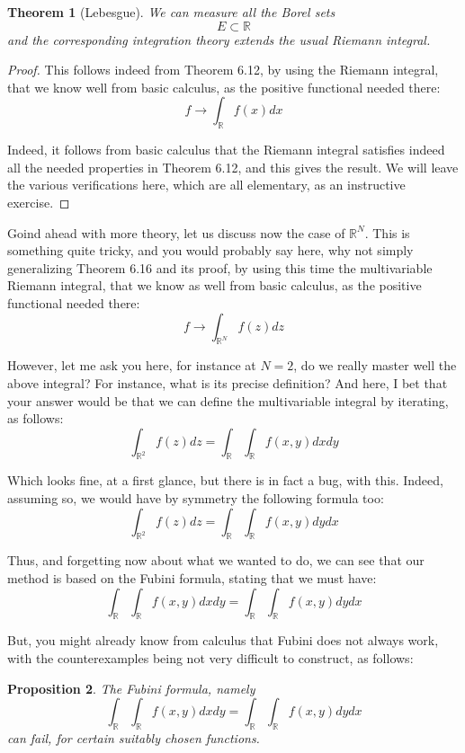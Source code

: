 \documentclass[12pt]{amsbook}
\newtheorem{theorem}{Theorem}[chapter]
\newtheorem{proposition}[theorem]{Proposition}
\begin{document}
\begin{theorem}[Lebesgue]
We can measure all the Borel sets 
$$E\subset\mathbb R$$
and the corresponding integration theory extends the usual Riemann integral.
\end{theorem}

\begin{proof}
This follows indeed from Theorem 6.12, by using the Riemann integral, that we know well from basic calculus, as the positive functional needed there:
$$f\to\int_\mathbb Rf(x)dx$$

Indeed, it follows from basic calculus that the Riemann integral satisfies indeed all the needed properties in Theorem 6.12, and this gives the result. We will leave the various verifications here, which are all elementary, as an instructive exercise.
\end{proof}

Goind ahead with more theory, let us discuss now the case of $\mathbb R^N$. This is something quite tricky, and you would probably say here, why not simply generalizing Theorem 6.16 and its proof, by using this time the multivariable Riemann integral, that we know as well from basic calculus, as the positive functional needed there:
$$f\to\int_{\mathbb R^N}f(z)dz$$

However, let me ask you here, for instance at $N=2$, do we really master well the above integral? For instance, what is its precise definition? And here, I bet that your answer would be that we can define the multivariable integral by iterating, as follows:
$$\int_{\mathbb R^2}f(z)dz=\int_\mathbb R\int_\mathbb Rf(x,y)dxdy$$

Which looks fine, at a first glance, but there is in fact a bug, with this. Indeed, assuming so, we would have by symmetry the following formula too:
$$\int_{\mathbb R^2}f(z)dz=\int_\mathbb R\int_\mathbb Rf(x,y)dydx$$

Thus, and forgetting now about what we wanted to do, we can see that our method is based on the Fubini formula, stating that we must have:
$$\int_\mathbb R\int_\mathbb Rf(x,y)dxdy=\int_\mathbb R\int_\mathbb Rf(x,y)dydx$$

But, you might already know from calculus that Fubini does not always work, with the counterexamples being not very difficult to construct, as follows:

\begin{proposition}
The Fubini formula, namely 
$$\int_\mathbb R\int_\mathbb Rf(x,y)dxdy=\int_\mathbb R\int_\mathbb Rf(x,y)dydx$$
can fail, for certain suitably chosen functions.
\end{proposition}
\end{document}
